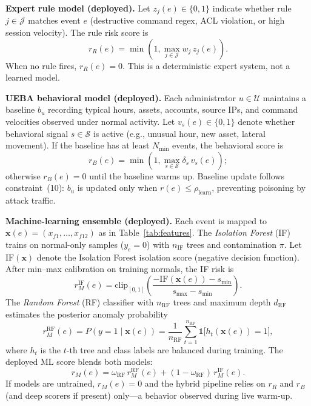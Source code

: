 \documentclass{ieeeaccess}
\begin{document}
\textbf{Expert rule model (deployed).} Let $z_j(e)\in\{0,1\}$ indicate whether rule $j\in\mathcal{J}$ matches event $e$ (destructive command regex, ACL violation, or high session velocity). The rule risk score is
\begin{equation}
r_R(e)=\min\!\left(1,\max_{j\in\mathcal{J}} w_j\, z_j(e)\right).
\tag{1}
\end{equation}
When no rule fires, $r_R(e)=0$. This is a deterministic expert system, not a learned model.

\textbf{UEBA behavioral model (deployed).} Each administrator $u\in\mathcal{U}$ maintains a baseline $b_u$ recording typical hours, assets, accounts, source IPs, and command velocities observed under normal activity. Let $v_s(e)\in\{0,1\}$ denote whether behavioral signal $s\in\mathcal{S}$ is active (e.g., unusual hour, new asset, lateral movement). If the baseline has at least $N_{\min}$ events, the behavioral score is
\begin{equation}
r_B(e)=\min\!\left(1,\max_{s\in\mathcal{S}} \delta_s\, v_s(e)\right);
\tag{2}
\end{equation}
otherwise $r_B(e)=0$ until the baseline warms up. Baseline update follows constraint~(10): $b_u$ is updated only when $r(e)\leq\rho_{\mathrm{learn}}$, preventing poisoning by attack traffic.

\textbf{Machine-learning ensemble (deployed).} Each event is mapped to $\mathbf{x}(e)=(x_{f1},\ldots,x_{f12})$ as in Table~\ref{tab:features}. The \textit{Isolation Forest} (IF) trains on normal-only samples ($y_e=0$) with $n_{\mathrm{IF}}$ trees and contamination $\pi$. Let $\mathrm{IF}(\mathbf{x})$ denote the Isolation Forest isolation score (negative decision function). After min--max calibration on training normals, the IF risk is
\begin{equation}
r_M^{\mathrm{IF}}(e) = \mathrm{clip}_{[0,1]}\!\left(\frac{-\mathrm{IF}(\mathbf{x}(e))-s_{\min}}{s_{\max}-s_{\min}}\right).
\tag{3.1}
\end{equation}
The \textit{Random Forest} (RF) classifier with $n_{\mathrm{RF}}$ trees and maximum depth $d_{\mathrm{RF}}$ estimates the posterior anomaly probability
\begin{equation}
r_M^{\mathrm{RF}}(e) = P(y{=}1\mid \mathbf{x}(e)) = \frac{1}{n_{\mathrm{RF}}}\sum_{t=1}^{n_{\mathrm{RF}}} \mathbb{1}\bigl[h_t(\mathbf{x}(e)){=}1\bigr],
\tag{3.2}
\end{equation}
where $h_t$ is the $t$-th tree and class labels are balanced during training. The deployed ML score blends both models:
\begin{equation}
r_M(e) = \omega_{\mathrm{RF}}\, r_M^{\mathrm{RF}}(e) + (1-\omega_{\mathrm{RF}})\, r_M^{\mathrm{IF}}(e).
\tag{3.3}
\end{equation}
If models are untrained, $r_M(e)=0$ and the hybrid pipeline relies on $r_R$ and $r_B$ (and deep scorers if present) only---a behavior observed during live warm-up.
\end{document}
